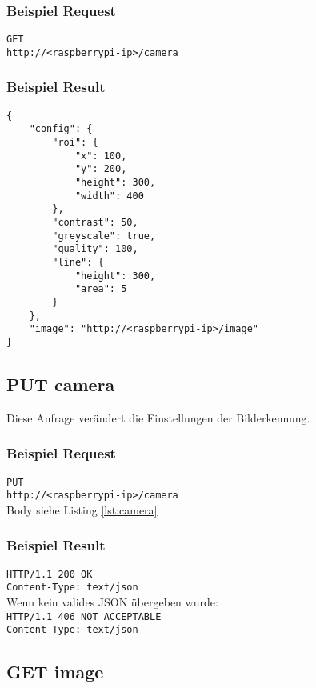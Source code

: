 \subsubsection{Beispiel Request}

\texttt{GET} \\
\texttt{http://<raspberrypi-ip>/camera}

\subsubsection{Beispiel Result}

\begin{lstlisting}[caption=GET camera Result, label=lst:camera, tabsize=2]
{
	"config": {
		"roi": {
			"x": 100,
			"y": 200,
			"height": 300,
			"width": 400
		},
		"contrast": 50,
		"greyscale": true,
		"quality": 100,
		"line": {
			"height": 300,
			"area": 5
		}
	},
	"image": "http://<raspberrypi-ip>/image"
}
\end{lstlisting}

\subsection{PUT camera}

Diese Anfrage verändert die Einstellungen der Bilderkennung.

\subsubsection{Beispiel Request}

\texttt{PUT} \\
\texttt{http://<raspberrypi-ip>/camera} \\
Body siehe Listing \ref{lst:camera}

\subsubsection{Beispiel Result}

\texttt{HTTP/1.1 200 OK} \\
\texttt{Content-Type: text/json} \\

\noindent
Wenn kein valides JSON übergeben wurde: \\

\noindent
\texttt{HTTP/1.1 406 NOT ACCEPTABLE} \\
\texttt{Content-Type: text/json}

\subsection{GET image}

